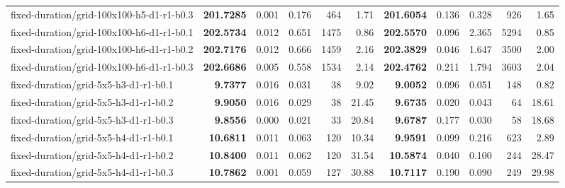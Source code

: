 \documentclass[10pt]{article}
\begin{document}
\begin{tabular}{p{65mm}rrrrrrrrrr}
fixed-\allowbreak duration/\allowbreak grid-\allowbreak 100x100-\allowbreak h5-\allowbreak d1-\allowbreak r1-\allowbreak b0.3 & \textbf{201.7285} & 0.001 & 0.176 & 464 & 1.71 & \textbf{201.6054} & 0.136 & 0.328 & 926 & 1.65 \\
fixed-\allowbreak duration/\allowbreak grid-\allowbreak 100x100-\allowbreak h6-\allowbreak d1-\allowbreak r1-\allowbreak b0.1 & \textbf{202.5734} & 0.012 & 0.651 & 1475 & 0.86 & \textbf{202.5570} & 0.096 & 2.365 & 5294 & 0.85 \\
fixed-\allowbreak duration/\allowbreak grid-\allowbreak 100x100-\allowbreak h6-\allowbreak d1-\allowbreak r1-\allowbreak b0.2 & \textbf{202.7176} & 0.012 & 0.666 & 1459 & 2.16 & \textbf{202.3829} & 0.046 & 1.647 & 3500 & 2.00 \\
fixed-\allowbreak duration/\allowbreak grid-\allowbreak 100x100-\allowbreak h6-\allowbreak d1-\allowbreak r1-\allowbreak b0.3 & \textbf{202.6686} & 0.005 & 0.558 & 1534 & 2.14 & \textbf{202.4762} & 0.211 & 1.794 & 3603 & 2.04 \\
fixed-\allowbreak duration/\allowbreak grid-\allowbreak 5x5-\allowbreak h3-\allowbreak d1-\allowbreak r1-\allowbreak b0.1 & \textbf{9.7377} & 0.016 & 0.031 & 38 & 9.02 & \textbf{9.0052} & 0.096 & 0.051 & 148 & 0.82 \\
fixed-\allowbreak duration/\allowbreak grid-\allowbreak 5x5-\allowbreak h3-\allowbreak d1-\allowbreak r1-\allowbreak b0.2 & \textbf{9.9050} & 0.016 & 0.029 & 38 & 21.45 & \textbf{9.6735} & 0.020 & 0.043 & 64 & 18.61 \\
fixed-\allowbreak duration/\allowbreak grid-\allowbreak 5x5-\allowbreak h3-\allowbreak d1-\allowbreak r1-\allowbreak b0.3 & \textbf{9.8556} & 0.000 & 0.021 & 33 & 20.84 & \textbf{9.6787} & 0.177 & 0.030 & 58 & 18.68 \\
fixed-\allowbreak duration/\allowbreak grid-\allowbreak 5x5-\allowbreak h4-\allowbreak d1-\allowbreak r1-\allowbreak b0.1 & \textbf{10.6811} & 0.011 & 0.063 & 120 & 10.34 & \textbf{9.9591} & 0.099 & 0.216 & 623 & 2.89 \\
fixed-\allowbreak duration/\allowbreak grid-\allowbreak 5x5-\allowbreak h4-\allowbreak d1-\allowbreak r1-\allowbreak b0.2 & \textbf{10.8400} & 0.011 & 0.062 & 120 & 31.54 & \textbf{10.5874} & 0.040 & 0.100 & 244 & 28.47 \\
fixed-\allowbreak duration/\allowbreak grid-\allowbreak 5x5-\allowbreak h4-\allowbreak d1-\allowbreak r1-\allowbreak b0.3 & \textbf{10.7862} & 0.001 & 0.059 & 127 & 30.88 & \textbf{10.7117} & 0.190 & 0.090 & 249 & 29.98 \\

\end{tabular}
\end{document}
